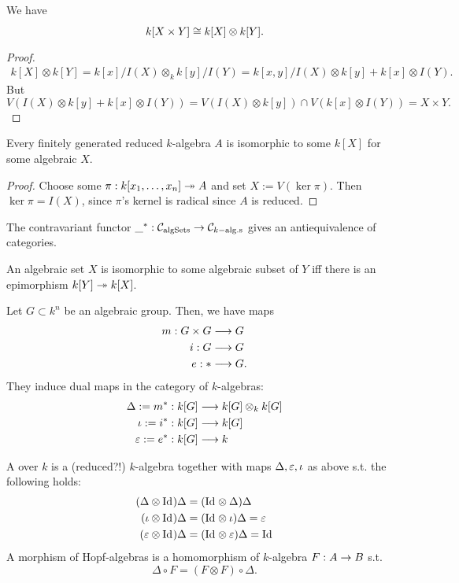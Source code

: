 \begin{lemma}
	We have
	\[ k[X \times Y] \overset{}{\cong} k[X] \otimes k[Y]. \]
\end{lemma}
\begin{proof}
\begin{align*}
k[X] \otimes k[Y] = k[x] / I(X) \otimes_k k[y] / I(Y) = k[x,y] / I(X) \otimes k[y] + k[x] \otimes I(Y).
\end{align*}
But
\[ V(I(X) \otimes k[y] + k[x] \otimes I(Y)) = V(I(X) \otimes k[y])\cap V(k[x] \otimes I(Y)) = X \times Y. \]
\end{proof}
\begin{theorem}
	Every finitely generated reduced $k$-algebra $A$ is isomorphic to some $k[X]$ for some algebraic $X$.
\end{theorem}
\begin{proof}
	Choose some $\pi : k[x_1,\ldots, x_n] \overset{}{\twoheadrightarrow} A$ and set $X := V(\ker \pi)$. Then $\ker \pi = I(X)$, since $\pi$'s kernel is radical since $A$ is reduced.
\end{proof}
\begin{corollary}
	The contravariant functor $\_^* : \mathcal{C}_{\mathrm{algSets}} \overset{}{\rightarrow} \mathcal{C}_{k\mathrm{-alg.s}}$ gives an antiequivalence of categories.
\end{corollary}
\begin{lemma}
	An algebraic set $X$ is isomorphic to some algebraic subset of $Y$ iff there is an epimorphism $k[Y] \overset{}{\twoheadrightarrow} k[X]$.
\end{lemma}


\begin{lemma}
Let $G \subset k^n$ be an algebraic group. Then, we have maps
\begin{align*}
m: G \times G &\overset{}{\longrightarrow} G\\
i : G & \overset{}{\longrightarrow} G\\
e : * & \overset{}{\longrightarrow} G.
\end{align*}
They induce dual maps in the category of $k$-algebras:
\begin{align*}
\Delta := m^* : k[G] & \overset{}{\longrightarrow} k[G] \otimes_k k[G]\\
\iota := i^* : k[G] &\overset{}{\longrightarrow} k[G]\\
\varepsilon := e^* : k[G] &\overset{}{\longrightarrow} k
\end{align*}
\end{lemma}
\begin{definition}
A  over $k$ is a (reduced?!) $k$-algebra together with maps $\Delta, \varepsilon, \iota $ as above s.t. the following holds:
\begin{align*}
(\Delta\otimes \text{Id}_{})\Delta &= (\text{Id}_{} \otimes \Delta)\Delta\\
(\iota\otimes \text{Id}_{})\Delta &= (\text{Id}_{} \otimes \iota)\Delta = \varepsilon\\
(\varepsilon\otimes \text{Id}_{})\Delta &= (\text{Id}_{} \otimes \varepsilon)\Delta = \text{Id}_{}
\end{align*}
A morphism of Hopf-algebras is a homomorphism of $k$-algebra $F : A \overset{}{\rightarrow} B$ s.t.
\[ \Delta \circ F = (F\otimes F) \circ \Delta. \]
\end{definition}

